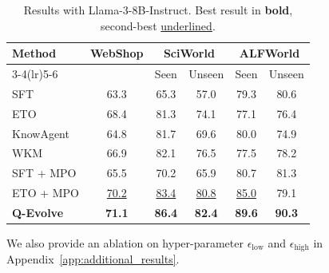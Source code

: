 \documentclass{article}
\theoremstyle{plain}
\theoremstyle{definition}
\theoremstyle{remark}
\begin{document}
\begin{table}[t]
\centering
\caption{Results with Llama-3-8B-Instruct. Best result in \textbf{bold}, second-best \underline{underlined}.}
\setlength{\tabcolsep}{3pt}
\begin{tabular}{lccccc}
\toprule
\multirow{2}{*}{Method} & \multirow{2}{*}{WebShop} & \multicolumn{2}{c}{SciWorld} & \multicolumn{2}{c}{ALFWorld} \\
\cmidrule(lr){3-4}\cmidrule(lr){5-6}
 & & Seen & Unseen & Seen & Unseen \\
\midrule
SFT            & 63.3 & 65.3 & 57.0 & 79.3 & 80.6 \\
ETO            & 68.4 & 81.3 & 74.1 & 77.1 & 76.4 \\
KnowAgent      & 64.8 & 81.7 & 69.6 & 80.0 & 74.9 \\
WKM            & 66.9 & 82.1 & 76.5 & 77.5 & 78.2 \\
SFT + MPO      & 65.5 & 70.2 & 65.9 & 80.7 & 81.3 \\
ETO + MPO      & \underline{70.2} & \underline{83.4} & \underline{80.8} & \underline{85.0} & 79.1 \\
\midrule
\textbf{Q-Evolve}  & \textbf{71.1} & \textbf{86.4} & \textbf{82.4} & \textbf{89.6} & \textbf{90.3} \\
\bottomrule
\end{tabular}
\label{tab:llama3}
\end{table}



We also provide an ablation on hyper-parameter $\epsilon_{\text{low}}$ and $\epsilon_{\text{high}}$ in Appendix~\ref{app:additional_results}.
\end{document}
